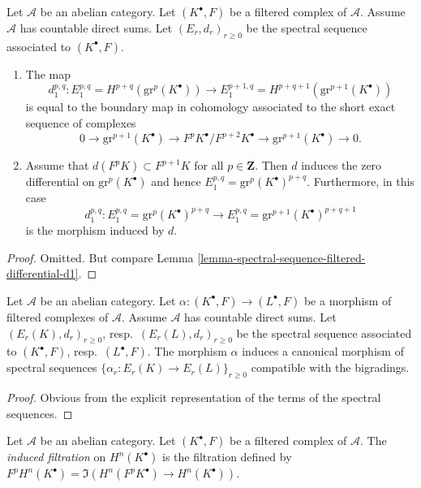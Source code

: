 \begin{lemma}
\label{lemma-spectral-sequence-filtered-complex-d1}
Let $\mathcal{A}$ be an abelian category.
Let $(K^\bullet, F)$ be a filtered complex of $\mathcal{A}$.
Assume $\mathcal{A}$ has countable direct sums.
Let $(E_r, d_r)_{r \geq 0}$ be the spectral sequence
associated to $(K^\bullet, F)$.
\begin{enumerate}
\item The map
$$
d_1^{p, q} :
E_1^{p, q} = H^{p + q}(\text{gr}^p(K^\bullet))
\longrightarrow
E_1^{p + 1, q} = H^{p + q + 1}(\text{gr}^{p + 1}(K^\bullet))
$$
is equal to the boundary map in cohomology associated to the short
exact sequence of complexes
$$
0 \to \text{gr}^{p + 1}(K^\bullet) \to
F^pK^\bullet/F^{p + 2}K^\bullet \to \text{gr}^{p + 1}(K^\bullet) \to 0.
$$
\item Assume that $d(F^pK) \subset F^{p + 1}K$ for all $p \in \mathbf{Z}$.
Then $d$ induces the zero differential on $\text{gr}^p(K^\bullet)$
and hence
$E_1^{p, q} = \text{gr}^p(K^\bullet)^{p + q}$.
Furthermore, in this case
$$
d_1^{p, q} :
E_1^{p, q} = \text{gr}^p(K^\bullet)^{p + q}
\longrightarrow
E_1^{p, q} = \text{gr}^{p + 1}(K^\bullet)^{p + q + 1}
$$
is the morphism induced by $d$.
\end{enumerate}
\end{lemma}

\begin{proof}
Omitted. But compare
Lemma \ref{lemma-spectral-sequence-filtered-differential-d1}.
\end{proof}

\begin{lemma}
\label{lemma-spectral-sequence-filtered-complex-functorial}
Let $\mathcal{A}$ be an abelian category.
Let $\alpha : (K^\bullet, F) \to (L^\bullet, F)$ be a morphism of
filtered complexes of $\mathcal{A}$. Assume $\mathcal{A}$ has
countable direct sums. Let $(E_r(K), d_r)_{r \geq 0}$,
resp.\ $(E_r(L), d_r)_{r \geq 0}$ be the spectral sequence associated
to $(K^\bullet, F)$, resp.\ $(L^\bullet, F)$.
The morphism $\alpha$ induces a canonical morphism of spectral
sequences $\{\alpha_r : E_r(K) \to E_r(L)\}_{r \geq 0}$ compatible
with the bigradings.
\end{lemma}

\begin{proof}
Obvious from the explicit representation of the terms of the
spectral sequences.
\end{proof}

\begin{definition}
\label{definition-filtration-cohomology-filtered-complex}
Let $\mathcal{A}$ be an abelian category.
Let $(K^\bullet, F)$ be a filtered complex of $\mathcal{A}$.
The {\it induced filtration} on $H^n(K^\bullet)$ is the filtration defined
by $F^pH^n(K^\bullet) = \Im(H^n(F^pK^\bullet) \to H^n(K^\bullet))$.
\end{definition}


